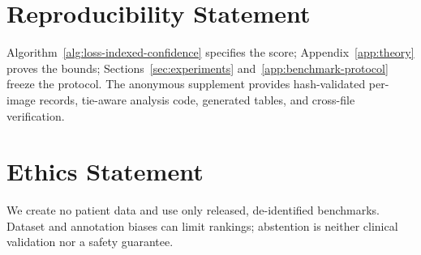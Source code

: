 \section*{Reproducibility Statement}

Algorithm~\ref{alg:loss-indexed-confidence} specifies the score;
Appendix~\ref{app:theory} proves the bounds; Sections~\ref{sec:experiments}
and~\ref{app:benchmark-protocol} freeze the protocol. The anonymous supplement
provides hash-validated per-image records, tie-aware analysis code, generated
tables, and cross-file verification.

\section*{Ethics Statement}

We create no patient data and use only released, de-identified benchmarks.
Dataset and annotation biases can limit rankings; abstention is neither clinical
validation nor a safety guarantee.
